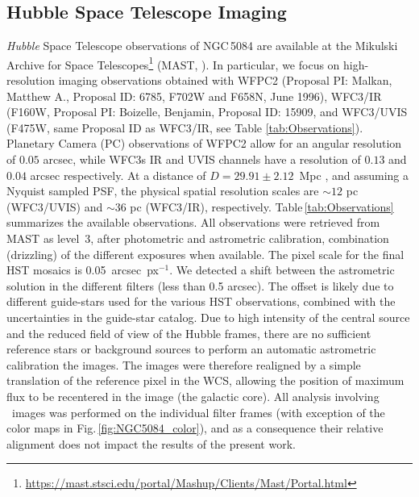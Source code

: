 \documentclass[modern]{CORE-AAS/aastex631}
\begin{document}
\subsection{Hubble Space Telescope Imaging} \label{sec:data_hst}
\emph{Hubble} Space Telescope observations of NGC\,5084 are available at the Mikulski Archive for Space Telescopes\footnote{\url{https://mast.stsci.edu/portal/Mashup/Clients/Mast/Portal.html}} (MAST, ). In particular, we focus on high-resolution imaging observations obtained with WFPC2 (Proposal PI: Malkan, Matthew A.,
Proposal ID: 6785, F702W and F658N, June 1996), WFC3/IR (F160W, Proposal PI: Boizelle, Benjamin, Proposal ID: 15909, and WFC3/UVIS (F475W, same Proposal ID as WFC3/IR, see Table \ref{tab:Observations}). Planetary Camera (PC) observations of WFPC2 allow for an angular resolution of $0.05$ arcsec, while WFC3s IR and UVIS channels have a resolution of $0.13$ and $0.04$ arcsec respectively. At a distance of $D=	29.91\pm2.12$~Mpc \citep[6.90~arcsec~kpc$^{-1}$,][]{koribalski+2004aj128_16}, and assuming a Nyquist sampled PSF, the physical spatial resolution scales are $\sim12$ pc (WFC3/UVIS) and $\sim36$ pc (WFC3/IR), respectively. Table\,\ref{tab:Observations} summarizes the available observations.
All observations were retrieved from MAST as level~3, after photometric and astrometric calibration, combination (drizzling) of the different exposures when available. The pixel scale for the final HST mosaics is 0.05~arcsec~px$^{-1}$. We detected a shift between the astrometric solution in the different filters (less than 0.5 arcsec). The offset is likely due to different guide-stars used for the various HST observations, combined with the uncertainties in the guide-star catalog. Due to high intensity of the central source and the reduced field of view of the Hubble frames, there are no sufficient reference stars or background sources to perform an automatic astrometric calibration the images. The images were therefore realigned by a simple translation of the reference pixel in the WCS, allowing the position of maximum flux to be recentered in the image (the galactic core). All analysis involving \Hubble\ images was performed on the individual filter frames (with exception of the color maps in Fig.\,\ref{fig:NGC5084_color}), and as a consequence their relative alignment does not impact the results of the present work.
\end{document}
